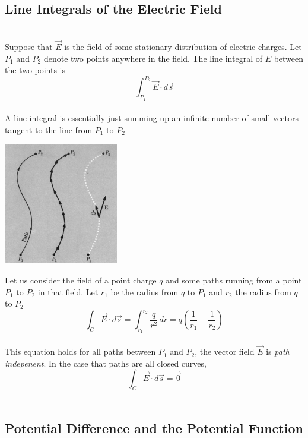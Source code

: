 \documentclass[svgnames]{article}
\begin{document}
\subsection{Line Integrals of the Electric Field} \mbox{} \\

Suppose that $\vec{E}$ is the field of some stationary distribution of electric charges. Let $P_1$ and $P_2$ denote two points anywhere in the field. The line integral of $E$ between the two points is 
\[ \int_{P_1}^{P_2} \vec{E} \cdot d\vec{s} \] \\

A line integral is essentially just summing up an infinite number of small vectors tangent to the line from $P_1$ to $P_2$ \\ 

\begin{center}
\includegraphics[width = 50mm]{ss8.png}
\end{center} 

Let us consider the field of a point charge $q$ and some paths running from a point $P_1$ to $P_2$ in that field. Let $r_1$ be the radius from $q$ to $P_1$ and $r_2$ the radius from $q$ to $P_2$ \\ 

\[ \int_C \vec{E} \cdot d\vec{s} = \int_{r_1}^{r_2} \frac{q}{r^2} \, dr = q\left(\frac{1}{r_1} - \frac{1}{r_2} \right) \] \\

This equation holds for all paths between $P_1$ and $P_2$, the vector field $\vec{E}$ is \textit{path indepenent}. In the case that paths are all closed curves, \\


\[ \int_C \vec{E} \cdot d\vec{s} = \vec{0} \] \\

\subsection{Potential Difference and the Potential Function} \mbox{} \\
\end{document}
